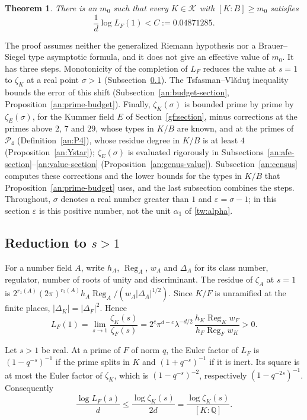 \documentclass[11pt]{amsart}
\numberwithin{equation}{section}
\newtheorem{theorem}[equation]{Theorem}
\theoremstyle{definition}
\theoremstyle{remark}
\newcommand{\Q}{\mathbb Q}
\newcommand{\ceiling}{0.04871285}
\begin{document}
\begin{theorem}\label{an:ceiling}
There is an $m_0$ such that every $K\in\mathcal K$ with $[K:B]\ge m_0$
satisfies
\[
 \frac1d\log L_F(1)<C:=\ceiling.
\]
\end{theorem}

The proof assumes neither the generalized Riemann hypothesis nor a
Brauer--Siegel type asymptotic formula, and it does not give an effective
value of $m_0$. It has three steps. Monotonicity of the completion of $L_F$
reduces the value at $s=1$ to $\zeta_K$ at a real point $\sigma>1$
(Subsection~\ref{an:reduction}). The Tsfasman--Vl\u{a}du\c{t} inequality
bounds the error of this shift (Subsection~\ref{an:budget-section},
Proposition~\ref{an:prime-budget}). Finally, $\zeta_K(\sigma)$ is bounded
prime by prime by $\zeta_E(\sigma)$, for the Kummer field $E$ of
Section~\ref{gf:section}, minus corrections at the primes above $2$, $7$
and $29$, whose types in $K/B$ are known, and at the primes of
$\mathcal P_4$ (Definition~\ref{an:P4}), whose residue degree in $K/B$ is
at least $4$ (Proposition~\ref{an:Ystar}); $\zeta_E(\sigma)$ is evaluated
rigorously in
Subsections~\ref{an:afe-section}--\ref{an:value-section}
(Proposition~\ref{an:genus-value}). Subsection~\ref{an:census} computes
these corrections and the lower bounds for the types in $K/B$ that
Proposition~\ref{an:prime-budget} uses, and the last subsection combines
the steps. Throughout, $\sigma$ denotes a real number greater than $1$ and
$\varepsilon=\sigma-1$; in this section $\varepsilon$ is this positive
number, not the unit $\alpha_1$ of \eqref{tw:alpha}.

\subsection{\texorpdfstring{Reduction to $s>1$}{Reduction to s > 1}}
\label{an:reduction}
For a number field $A$, write $h_A$, $\operatorname{Reg}_A$, $w_A$ and
$\Delta_A$ for its class number, regulator, number of roots of unity and
discriminant. The residue of $\zeta_A$ at $s=1$ is
$2^{r_1(A)}(2\pi)^{r_2(A)}h_A\operatorname{Reg}_A/(w_A|\Delta_A|^{1/2})$.
Since $K/F$ is unramified at the finite places, $|\Delta_K|=|\Delta_F|^2$.
Hence
\begin{equation}\label{an:class-formula}
 L_F(1)=\lim_{s\to1}\frac{\zeta_K(s)}{\zeta_F(s)}
 =2^c\pi^{d-c}\lambda^{-d/2}\,
 \frac{h_K\operatorname{Reg}_Kw_F}{h_F\operatorname{Reg}_Fw_K}>0.
\end{equation}

Let $s>1$ be real. At a prime of $F$ of norm $q$, the Euler factor of $L_F$
is $(1-q^{-s})^{-1}$ if the prime splits in $K$ and $(1+q^{-s})^{-1}$ if it
is inert. Its square is at most the Euler factor of $\zeta_K$, which is
$(1-q^{-s})^{-2}$, respectively $(1-q^{-2s})^{-1}$. Consequently
\begin{equation}\label{an:relative-euler}
 \frac{\log L_F(s)}d\le\frac{\log\zeta_K(s)}{2d}
 =\frac{\log\zeta_K(s)}{[K:\Q]}.
\end{equation}
\end{document}
